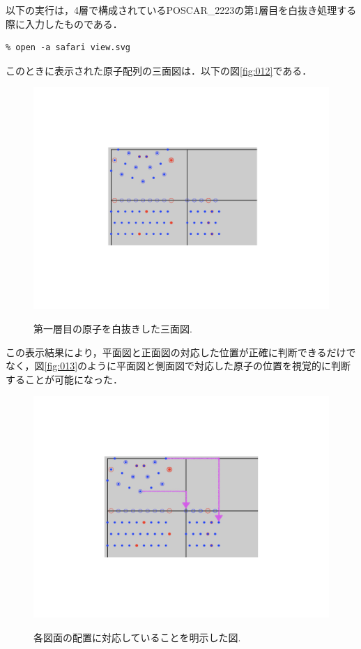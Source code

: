 以下の実行は，4層で構成されているPOSCAR\_2223の第1層目を白抜き処理する際に入力したものである．
\begin{lstlisting}[style=customCsh,basicstyle={\scriptsize\ttfamily}]
% ruby viewer.rb POSCAR_2223 POSCAR_2223_4 1/4
% open -a safari view.svg 
\end{lstlisting}
このときに表示された原子配列の三面図は．以下の図\ref{fig:012}である．

\begin{figure}[htbp]\begin{center}
\includegraphics[width=12cm,bb= 0 0 937 753]{../figs/./boundary_narita.012.jpeg}
\caption{第一層目の原子を白抜きした三面図.}
\label{fig:012}
\label{default}\end{center}\end{figure}
この表示結果により，平面図と正面図の対応した位置が正確に判断できるだけでなく，図\ref{fig:013}のように平面図と側面図で対応した原子の位置を視覚的に判断することが可能になった．

\begin{figure}[htbp]\begin{center}
\includegraphics[width=12cm,bb= 0 0 937 753]{../figs/./boundary_narita.013.jpeg}
\caption{各図面の配置に対応していることを明示した図.}
\label{fig:013}
\label{default}\end{center}\end{figure}
